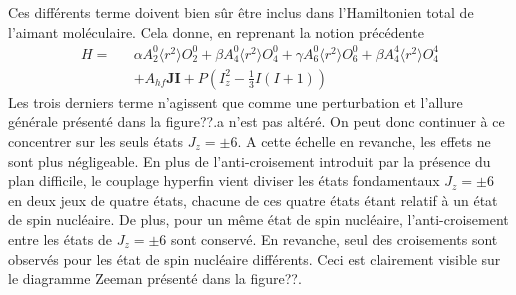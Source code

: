 Ces différents terme doivent bien s\^ur \^etre inclus dans l'Hamiltonien total de l'aimant moléculaire. Cela donne, en reprenant la notion précédente
\begin{eqnarray}
H =&& \alpha A_2^0 \langle r^2 \rangle O_2^0 + \beta A_4^0 \langle r^2 \rangle O_4^0 + \gamma A_6^0 \langle r^2 \rangle O_6^0 + \beta A_4^4 \langle r^2 \rangle O_4^4 \\ \nonumber
 &&+ A_{hf}\mathbf{J}\mathbf{I} + P\left(I_z^2 - \frac{1}{3}I(I+1)\right)
\end{eqnarray}
Les trois derniers terme n'agissent que comme une perturbation et l'allure générale présenté dans la figure??.a n'est pas altéré. On peut donc continuer à ce concentrer sur les seuls états $J_z = \pm 6$. A cette échelle en revanche, les effets ne sont plus négligeable. En plus de l'anti-croisement introduit par la présence du plan difficile, le couplage hyperfin vient diviser les états fondamentaux  $J_z = \pm 6$ en deux jeux de quatre états, chacune de ces quatre états étant relatif à un état de spin nucléaire. De plus, pour un m\^eme état de spin nucléaire, l'anti-croisement entre les états de  $J_z = \pm 6$ sont conservé. En revanche, seul des croisements sont observés pour les état de spin nucléaire différents. Ceci est clairement visible sur le diagramme Zeeman présenté dans la figure??.